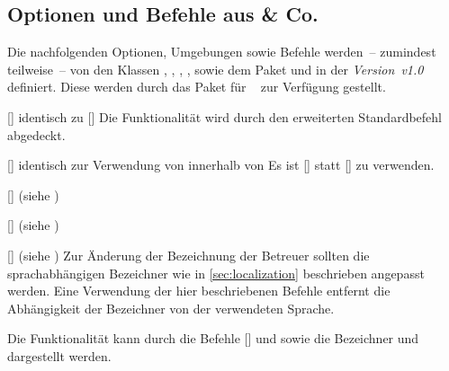 \begin{DeclareEntity}{}
\subsection{Optionen und Befehle aus  \& Co.}
%
Die nachfolgenden Optionen, Umgebungen sowie Befehle werden~-- zumindest 
teilweise~-- von den Klassen , , 
, ,  sowie dem Paket 
 und \TUDScript in der \emph{Version~v1.0} definiert. Diese 
werden durch das Paket  für \TUDScript~\vTUDScript{} zur 
Verfügung gestellt.

\begin{Declaration}
  {[]}
  {identisch zu []}
\printdeclarationlist
%
Die Funktionalität wird durch den erweiterten Standardbefehl  
abgedeckt.
\end{Declaration}

\begin{Declaration}
  {[]}
  {identisch zur Verwendung von  innerhalb von }
\printdeclarationlist
%
Es ist []
statt [] zu verwenden.
\end{Declaration}

\begin{Declaration}
  {[]}
  (siehe )
\begin{Declaration}
  {[]}
  (siehe )
\begin{Declaration}
  {[]}
  (siehe )
\printdeclarationlist
%
Zur Änderung der Bezeichnung der Betreuer sollten die sprachabhängigen 
Bezeichner wie in \autoref{sec:localization} beschrieben angepasst werden. Eine 
Verwendung der hier beschriebenen Befehle entfernt die Abhängigkeit der 
Bezeichner von der verwendeten Sprache.
\end{Declaration}
\end{Declaration}
\end{Declaration}

\begin{Declaration}
  {}
\printdeclarationlist
%
Die Funktionalität kann durch die Befehle [] und 
 sowie die Bezeichner  und 
 dargestellt werden.
\end{Declaration}


\end{DeclareEntity}

